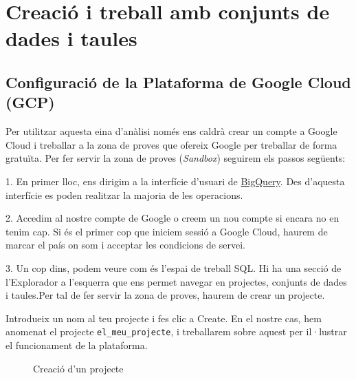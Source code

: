 \documentclass[12pt,longbibliography]{article}
\theoremstyle{definition}
\theoremstyle{remark}
\begin{document}
\pagebreak

\section{Creació i treball amb conjunts de dades i taules}

\subsection{Configuració de la Plataforma de Google Cloud (GCP)}

\graphicspath{ {BigQuery/Imatges tutorial/} }

Per utilitzar aquesta eina d’anàlisi només ens caldrà crear un compte a Google Cloud i treballar a la zona de proves que ofereix Google per treballar de forma gratuïta.
Per fer servir la zona de proves (\textit{Sandbox}) seguirem els passos següents: 

1. En primer lloc, ens dirigim a la interfície d’usuari de \href{https://console.cloud.google.com}{BigQuery}. Des d'aquesta interfície es poden realitzar la majoria de les operacions.

\vspace{2mm}

2. Accedim al nostre compte de Google o creem un nou compte si encara no en tenim cap. Si és el primer cop que iniciem sessió a Google Cloud, haurem de marcar el país on som i acceptar les condicions de servei.

\vspace{2mm}

3. Un cop dins, podem veure com és l'espai de treball SQL. Hi ha una secció de l'Explorador a l'esquerra que ens permet navegar en projectes, conjunts de dades i taules.Per tal de fer servir la zona de proves, haurem de crear un projecte.

Introdueix un nom al teu projecte i fes clic a Create. En el nostre cas, hem anomenat el projecte \verb|el_meu_projecte|, i treballarem sobre aquest per il·lustrar el funcionament de la plataforma.

\vspace{2mm}
\begin{figure}[h!]
\par
{}%
\hfill
{}%
\par
\caption{Creació d'un projecte}
\label{fig:bq1}
\end{figure}
\vspace{2mm}
\end{document}
